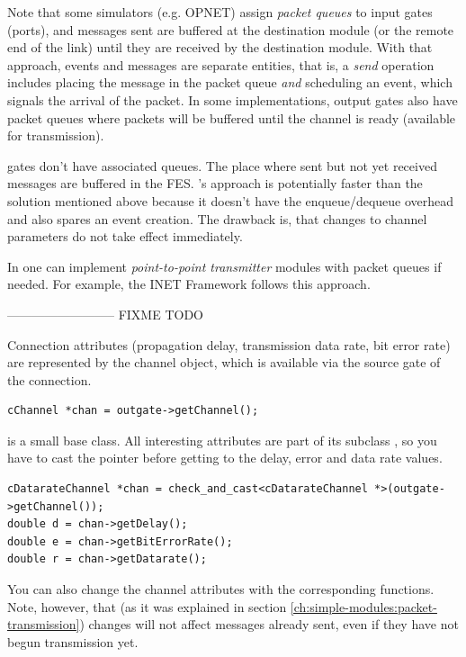 Note that some simulators (e.g. OPNET) assign \textit{packet queues}
to input gates (ports), and messages sent are buffered at the
destination module (or the remote end of the link) until they are
received by the destination module. With that approach, events and
messages are separate entities, that is, a \textit{send} operation
includes placing the message in the packet queue \textit{and} scheduling
an event, which signals the arrival of the packet. In some implementations,
output gates also have packet queues where packets will be buffered until
the channel is ready (available for transmission).

{\opp} gates don't have associated queues. The place
where sent but not yet received messages are buffered in the
FES.  {\opp}'s approach is potentially faster
than the solution mentioned above because it doesn't have the
enqueue/dequeue overhead and also spares an event creation. The
drawback is, that changes to channel parameters do not take effect
immediately.

In {\opp} one can implement \textit{point-to-point transmitter} modules
with packet queues if needed. For example, the INET Framework
follows this approach.




--------------------------
FIXME TODO

Connection attributes (propagation delay, transmission data rate,
bit error rate) are represented by the channel object, which
is available via the source gate of the connection.

\begin{verbatim}
cChannel *chan = outgate->getChannel();
\end{verbatim}

 is a small base class. All interesting attributes are
part of its subclass , so you have to cast the pointer
before getting to the delay, error and data rate values.

\begin{verbatim}
cDatarateChannel *chan = check_and_cast<cDatarateChannel *>(outgate->getChannel());
double d = chan->getDelay();
double e = chan->getBitErrorRate();
double r = chan->getDatarate();
\end{verbatim}

You can also change the channel attributes with the corresponding
 functions. Note, however, that (as it was explained in
section \ref{ch:simple-modules:packet-transmission})
changes will not affect messages already sent, even if they have not
begun transmission yet.

